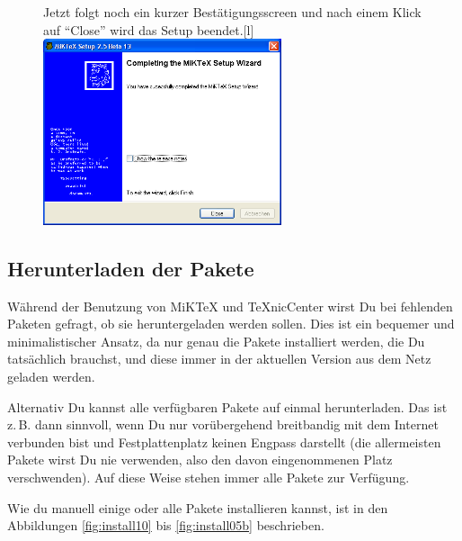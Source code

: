 \begin{figure}[th]
	\begin{captionbeside}{Jetzt folgt noch ein kurzer Bestätigungsscreen und nach einem Klick auf \enquote{Close} wird das Setup beendet.}[l]
		\includegraphics[width=7cm]{images/MiKTeX-install-08.png}
	\end{captionbeside}
	\label{fig:install08}
\end{figure}

\clearpage %

\subsection{Herunterladen der Pakete}
\label{subsec:instpakete}

Während der Benutzung von MiKTeX und TeXnicCenter wirst Du bei fehlenden Paketen gefragt, ob sie heruntergeladen werden sollen. Dies ist ein bequemer und minimalistischer Ansatz, da nur genau die Pakete installiert werden, die Du tatsächlich brauchst, und diese immer in der aktuellen Version aus dem Netz geladen werden. 

Alternativ Du kannst alle verfügbaren Pakete auf einmal herunterladen. Das ist z.\,B. dann sinnvoll, wenn Du nur vorübergehend breitbandig mit dem Internet verbunden bist und Festplattenplatz keinen Engpass darstellt (die allermeisten Pakete wirst Du nie verwenden, also den davon eingenommenen Platz verschwenden). Auf diese Weise stehen immer alle Pakete zur Verfügung.

Wie du manuell einige oder alle Pakete installieren kannst, ist in den Abbildungen \ref{fig:install10} bis \ref{fig:install05b} beschrieben. 

